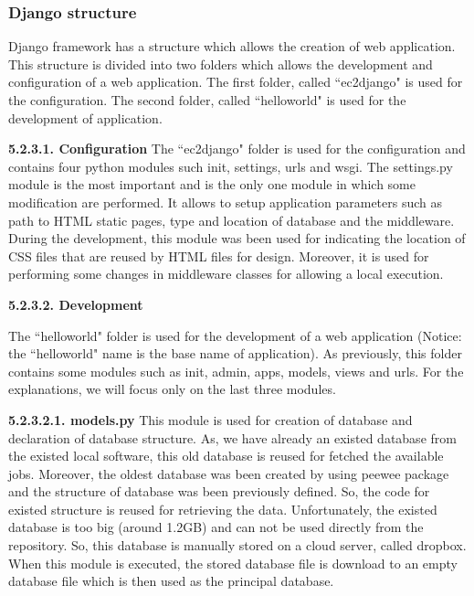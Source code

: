 \documentclass[conference,compsoc]{IEEEtran}
\begin{document}
\subsubsection{Django structure}
Django framework has a structure which allows the creation of web application. This structure is divided into two folders which allows the development and configuration of a web application. The first folder, called ``ec2django" is used for the configuration. The second folder, called ``helloworld" is used for the development of application.

\noindent
\newline\newline
\textbf{5.2.3.1. Configuration}
\newline
The ``ec2django" folder is used for the configuration and contains four python modules such init, settings, urls and wsgi. The settings.py module is the most important and is the only one module in which some modification are performed. It allows to setup application parameters such as path to HTML static pages, type and location of database and the middleware. During the development, this module was been used for indicating the location of CSS files that are reused by HTML files for design. Moreover, it is used for performing some changes in middleware classes for allowing a local execution. 

\noindent
\newline\newline
\textbf{5.2.3.2. Development}
\newline

The ``helloworld" folder is used for the development of a web application (Notice: the ``helloworld" name is the base name of application). As previously, this folder contains some modules such as init, admin, apps, models, views and urls. For the explanations, we will focus only on the last three modules.

\noindent
\newline\newline
\textbf{5.2.3.2.1. models.py}
\newline\newline
This module is used for creation of database and declaration of database structure. As, we have already an existed database from the existed local software, this old database is reused for fetched the available jobs. Moreover, the oldest database was been created by using peewee package and the structure of database was been previously defined. So, the code for existed structure is reused for retrieving the data.  
\newline
Unfortunately, the existed database is too big (around 1.2GB) and can not be used directly from the repository. So, this database is manually stored on a cloud server, called dropbox. When this module is executed, the stored database file is download to an empty database file which is then used as the principal database. 
\end{document}
